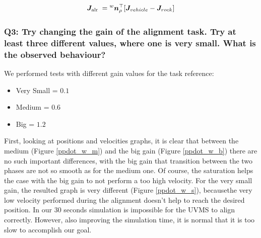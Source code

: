 \documentclass{article}
\begin{document}
\begin{equation}
\large
\boldsymbol J_{\text {alr }}={^w}{\boldsymbol n_{\rho}^\top}[{ \boldsymbol J_{vehicle} - \boldsymbol J_{rock}}]
\end{equation}

\subsubsection{Q3: Try changing the gain of the alignment task. Try at least three different values, where one is very small. What is the observed behaviour?} 
We performed tests with different gain values for the task reference:
\begin{itemize}
	\item Very Small = $0.1$
	\item Medium = $0.6$
	\item Big = $1.2$
\end{itemize}
First, looking at positions and velocities graphs, it is clear that between the medium (Figure \ref{ppdot_w_m}) and the big gain (Figure \ref{ppdot_w_b}) there are no such important differences, with the big gain that transition between the two phases are not so smooth as for the medium one. Of course, the saturation helps the case with the big gain to not perform a too high velocity. 
For the very small gain, the resulted graph is very different (Figure \ref{ppdot_w_s}), becausethe very low velocity performed during the alignment doesn't help to reach the desired position. In our 30 seconds simulation is impossible for the UVMS to align correctly. However, also improving the simulation time, it is normal that it is too slow to accomplish our goal.
\end{document}

